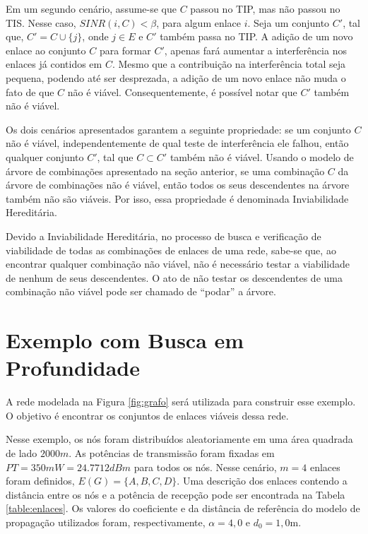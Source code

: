 Em um segundo cenário, assume-se que $C$ passou no TIP, mas não passou no TIS. Nesse caso, $SINR(i,C) < \beta$, para algum enlace $i$. Seja um conjunto $C'$, tal que, $C' = C \cup \{j\}$, onde $j \in E$ e $C'$ também passa no TIP. A adição de um novo enlace ao conjunto $C$ para formar $C'$, apenas fará aumentar a interferência nos enlaces já contidos em $C$. Mesmo que a contribuição na interferência total seja pequena, podendo até ser desprezada, a adição de um novo enlace não muda o fato de que $C$ não é viável. Consequentemente, é possível notar que $C'$ também não é viável.

Os dois cenários apresentados garantem a seguinte propriedade: se um conjunto $C$ não é viável, independentemente de qual teste de interferência ele falhou, então qualquer conjunto $C'$, tal que $C \subset C'$ também não é viável. Usando o modelo de árvore de combinações apresentado na seção anterior, se uma combinação $C$ da árvore de combinações não é viável, então todos os seus descendentes na árvore também não são viáveis. Por isso, essa propriedade é denominada Inviabilidade Hereditária. 

Devido a Inviabilidade Hereditária, no processo de busca e verificação de viabilidade de todas as combinações de enlaces de uma rede, sabe-se que, ao encontrar qualquer combinação não viável, não é necessário testar a viabilidade de nenhum de seus descendentes. O ato de não testar os descendentes de uma combinação não viável pode ser chamado de ``podar'' a árvore. 

\section{Exemplo com Busca em Profundidade}
\label{section:bp}

A rede modelada na Figura \ref{fig:grafo} será utilizada para construir esse exemplo. O objetivo é encontrar os conjuntos de enlaces viáveis dessa rede. 

Nesse exemplo, os nós foram distribuídos aleatoriamente em uma área quadrada de lado $2000m$. As potências de transmissão foram fixadas em $PT=350mW=24.7712dBm$ para todos os nós. Nesse cenário, $m=4$ enlaces foram definidos, $E(G)=\{A, B, C, D\}$. Uma descrição dos enlaces contendo a distância entre os nós e a potência de recepção pode ser encontrada na Tabela \ref{table:enlaces}. Os valores do coeficiente e da distância de referência do modelo de propagação utilizados foram, respectivamente, $\alpha=4,0$ e $d_0=1,0$m.

